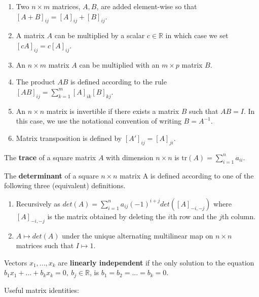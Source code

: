 \documentclass[12pt,]{book}
\providecommand{\tightlist}{%
  \setlength{\itemsep}{0pt}\setlength{\parskip}{0pt}}
\begin{document}
\begin{enumerate}
\def\labelenumi{\arabic{enumi}.}
\tightlist
\item
  Two \(n \times m\) matrices, \(A,B\), are added element-wise so that \([A+B]_ {ij} = [A]_ {ij} + [B]_ {ij}\).
\item
  A matrix \(A\) can be multiplied by a scalar \(c\in \mathbb{R}\) in which case we set \([cA]_{ij} = c[A]_ {ij}\).\\
\item
  An \(n \times m\) matrix \(A\) can be multiplied with an \(m \times p\) matrix \(B\).\\
\item
  The product \(AB\) is defined according to the rule \([AB]_{ij} = \sum_{k=1}^m [A]_{ik}[B]_{kj}\).
\item
  An \(n \times n\) matrix is invertible if there exists a matrix \(B\) such that \(AB=I\). In this case, we use the notational convention of writing \(B = A^{-1}\).
\item
  Matrix transposition is defined by \([A'] _ {ij} = [A] _ {ji}\).
\end{enumerate}

The \textbf{trace} of a square matrix \(A\) with dimension \(n \times n\) is \(\text{tr}(A) = \sum _ {i=1}^n a _ {ii}\).

The \textbf{determinant} of a square \(n \times n\) matrix A is defined according to one of the following three (equivalent) definitions.

\begin{enumerate}
\def\labelenumi{\arabic{enumi}.}
\tightlist
\item
  Recursively as \(det(A) = \sum_{i=1}^n a_{ij} (-1)^{i+j} det([A]_{-i,-j})\) where \([A]_{-i,-j}\) is the matrix obtained by deleting the \(i\)th row and the \(j\)th column.
\item
  \(A \mapsto det(A)\) under the unique alternating multilinear map on \(n \times n\) matrices such that \(I \mapsto 1\).
\end{enumerate}

Vectors \(x_1,...,x_k\) are \textbf{linearly independent} if the only solution to the equation \(b_1x_1 + ... + b_k x_k=0, \ b_j \in \mathbb R\), is \(b_1=b_2=...=b_k=0\).

Useful matrix identities:
\end{document}
